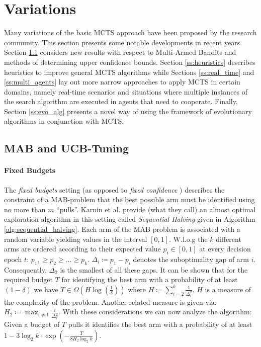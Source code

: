 \section{Variations}
\label{sec:variations}
Many variations of the basic MCTS approach have been proposed by the research community. This section presents some notable developments in recent years. Section \ref{ss:mab} considers new results with respect to Multi-Armed Bandits and methods of determining upper confidence bounds. Section \ref{ss:heuristics} describes heuristics to improve general MCTS algorithms while Sections \ref{ss:real_time} and \ref{ss:multi_agents} lay out more narrow approaches to apply MCTS in certain domains, namely real-time scenarios and situations where multiple instances of the search algorithm are executed in agents that need to cooperate. Finally, Section \ref{ss:evo_alg} presents a novel way of using the framework of evolutionary algorithms in conjunction with MCTS.
\subsection{MAB and UCB-Tuning}
\label{ss:mab}
\paragraph{Fixed Budgets}
The \textit{fixed budgets} setting (as opposed to \textit{fixed confidence} \cite{jamieson2014best}) describes the constraint of a MAB-problem that the best possible arm must be identified using no more than $m$ \enquote{pulls}.
Karnin et al. \cite{karnin2013almost} provide (what they call) an almost optimal exploration algorithm in this setting called \textit{Sequential Halving} given in Algorithm \ref{alg:sequential_halving}. Each arm of the MAB problem is associated with a random variable yielding values in the interval $[0,1]$. W.l.o.g the $k$ different arms are ordered according to their expected value $p_i \in [0,1]$ at every decision epoch $t$: $p_1, \geq p_2 \geq \ldots \geq p_k$. $\Delta_i \coloneqq p_1 - p_i$ denotes the suboptimality gap of arm $i$. Consequently, $\Delta_2$ is the smallest of all these gaps. It can be shown that for the required budget $T$ for identifying the best arm with a probability of at least $(1-\delta)$ we have $T \in \Omega(H \log (\frac{1}{\delta}))$ where $H \coloneqq \sum_{i=2}^{k} \frac{1}{\Delta_i^2}$. $H$ is a measure of the complexity of the problem. Another related measure is given via: $H_2 \coloneqq \max_{i \neq 1} \frac{i}{\Delta_i^2}$. With these considerations we can now analyze the algorithm: Given a budget of $T$ pulls it identifies the best arm with a probability of at least $1-3 \log_2 k \cdot \exp \left(-\frac{T}{8H_2 \log_2 k}\right)$. 

